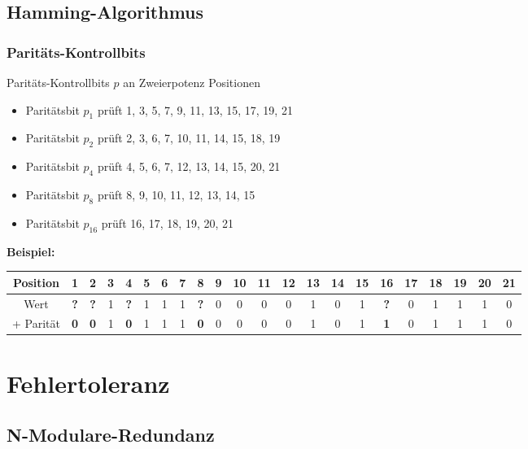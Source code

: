 \documentclass[a4paper, landscape]{article}
\newenvironment{example}{
    \par\vspace{\abovedisplayskip}\noindent\textbf{Beispiel:}\par
}{\par\vspace{\belowdisplayskip}}
\begin{document}
\begin{multicols}{3}
        
        \subsection{Hamming-Algorithmus}
        
        \subsubsection*{Paritäts-Kontrollbits}
        Paritäts-Kontrollbits $p$ an Zweierpotenz Positionen
        \begin{itemize}
            \item Paritätsbit $p_{1}$ prüft 1, 3, 5, 7, 9, 11, 13, 15, 17, 19, 21
            \item Paritätsbit $p_{2}$ prüft 2, 3, 6, 7, 10, 11, 14, 15, 18, 19
            \item Paritätsbit $p_{4}$ prüft 4, 5, 6, 7, 12, 13, 14, 15, 20, 21
            \item Paritätsbit $p_{8}$ prüft 8, 9, 10, 11, 12, 13, 14, 15
            \item Paritätsbit $p_{16}$ prüft 16, 17, 18, 19, 20, 21
        \end{itemize}
        
        \begin{example}
         \begingroup\setlength\tabcolsep{1.9pt}\scriptsize
            \begin{tabular}{cccccccccccccccccccccc}
             Position   & \textbf{1} & \textbf{2} & 3 & \textbf{4} & 5 & 6 & 7 & \textbf{8} & 9 & 10 & 11 & 12 & 13 & 14 & 15 & \textbf{16} & 17 & 18 & 19 & 20 & 21 \\
             \hline
             Wert       & \textbf{?} & \textbf{?} & 1 & \textbf{?} & 1 & 1 & 1 & \textbf{?} & 0 & 0 & 0 & 0 & 1 & 0 & 1 & \textbf{?} & 0 & 1 & 1 & 1 & 0 \\
             + Parität  & \textbf{0} & \textbf{0} & 1 & \textbf{0} & 1 & 1 & 1 & \textbf{0} & 0 & 0 & 0 & 0 & 1 & 0 & 1 & \textbf{1} & 0 & 1 & 1 & 1 & 0 \\
            \end{tabular}
         \endgroup
        \end{example}

        \section{Fehlertoleranz}
        
        \subsection{N-Modulare-Redundanz}

\end{multicols}
\end{document}
